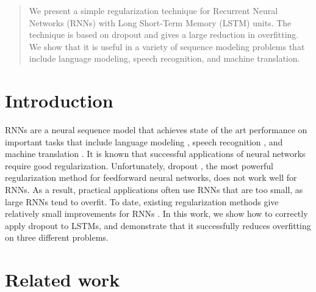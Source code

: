 \documentclass{article}
\begin{document}
 


\begin{abstract} 
  We present a simple regularization technique for Recurrent Neural
  Networks (RNNs) with Long Short-Term Memory (LSTM) units.  The
  technique is based on dropout and gives a large reduction in
  overfitting.  We show that it is useful in a variety of sequence
  modeling problems that include language modeling, speech
  recognition, and machine translation.
\end{abstract} 

\section{Introduction}

RNNs are a neural sequence model that achieves state of the art
performance on important tasks that include language modeling
\cite{mikolov2012statistical}, speech recognition
\cite{graves2013speech}, and machine translation
\cite{cho2014learning}.  It is known that successful applications of
neural networks require good regularization. Unfortunately, dropout
\cite{srivastava2013improving},  the most powerful regularization method
for feedforward neural networks, does not work well for
RNNs. As a result, practical applications often
use RNNs that are too small, as large RNNs tend to overfit.  To date,
existing regularization methods give relatively small improvements for
RNNs \cite{graves2013generating}.
In this work, we show how to correctly apply dropout to LSTMs, and
demonstrate that it successfully reduces overfitting on three different problems. 

\section{Related work}
\end{document}
